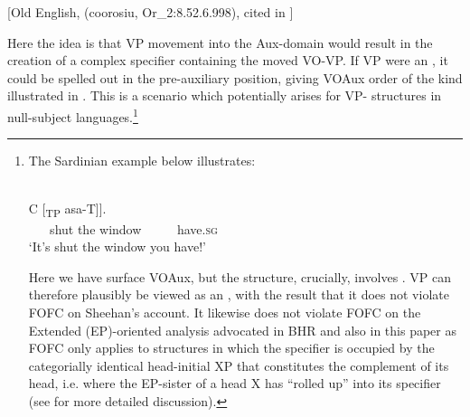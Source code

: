\documentclass[output=paper]{LSP/langsci}
\begin{document}
[Old English, \citealt[13]{Pintzuk2005}  (coorosiu, Or\_2:8.52.6.998), cited in \citealt[429]{Sheehan2013fofc}]
\z
\z

Here the idea is that VP movement into the Aux-domain would result in the creation of a complex specifier containing the moved VO-VP. If VP were an , it could be spelled out in the pre-auxiliary position, giving VOAux order of the kind illustrated in . This is a scenario which potentially arises for VP- structures in null-subject languages.\footnote{\relax%
\label{fn:biberauer:10}%
The Sardinian example below illustrates:
\let\eachwordone\upshape
\begin{exe}
  \\
          \gll [\textsubscript{CP} [\textsubscript{VP} \textbf{Tunkatu} \textbf{su} \textbf{barkone} ] C [\textsubscript{TP} asa-T]].\\
          ~ ~  shut      the window       ~ ~ ~       have.\textsc{sg}\\
           \glt ‘It’s shut the window you have!’     \citep[339]{Jones1988}
\end{exe}
Here we have surface VOAux, but the structure, crucially, involves . VP can therefore plausibly be viewed as an , with the result that it does not violate FOFC on Sheehan’s account. It likewise does not violate FOFC on the Extended  (EP)-oriented analysis advocated in BHR and also in this paper as FOFC only applies to structures in which the specifier is occupied by the categorially identical head-initial XP that constitutes the complement of its head, i.e. where the EP-sister of a head X has “rolled up” into its specifier (see \citealt{Biberauer2017optionalv2} for more detailed discussion). 

}
\end{document}
